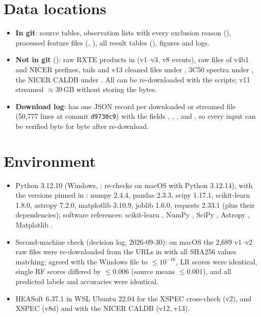 \section{Data locations}
\begin{itemize}
\item \textbf{In git}: source tables, observation lists with every exclusion reason (), processed feature
files (, ), all result tables (), figures and logs.
\item \textbf{Not in git} (): raw RXTE products in  (v1--v3, v8 events), raw files of v4b1 and NICER prefixes,
tails and v13 cleaned files under , 3C50 spectra under
, the NICER CALDB under . All can be
re-downloaded with the scripts; v11 streamed $\approx39$\,GB without storing the bytes.
\item \textbf{Download log}:  has one JSON record per downloaded or streamed file (50,777 lines at commit
\texttt{d9730c9}) with the fields , , ,  and , so every input can be verified
byte for byte after re-download.
\end{itemize}

\section{Environment}
\begin{itemize}
\item Python 3.12.10 (Windows, ; re-checks on macOS with Python 3.12.14), with the versions pinned in
: numpy 2.4.4, pandas 2.3.3, scipy 1.17.1, scikit-learn 1.8.0, astropy 7.2.0, matplotlib 3.10.9, joblib 1.6.0,
requests 2.33.1 (plus their dependencies); software references: scikit-learn \citep{Pedregosa2011}, NumPy \citep{Harris2020},
SciPy \citep{Virtanen2020}, Astropy \citep{Astropy2022}, Matplotlib \citep{Hunter2007}.
\item Second-machine check (decision log, 2026-09-30): on macOS the 2,689 v1--v2 raw files were re-downloaded from the URLs in
 with all SHA256 values matching;  agreed with the Windows file to $\le10^{-16}$, LR scores were
identical, single RF scores differed by $\le0.006$ (source means $\le0.001$), and all predicted labels and accuracies were identical.
\item HEASoft 6.37.1 \citep{HEASoft2014} in WSL Ubuntu 22.04 for the XSPEC \citep{Arnaud1996} cross-check (v2),  and XSPEC  (v8d) and  with
the NICER CALDB (v12, v13).
\end{itemize}

